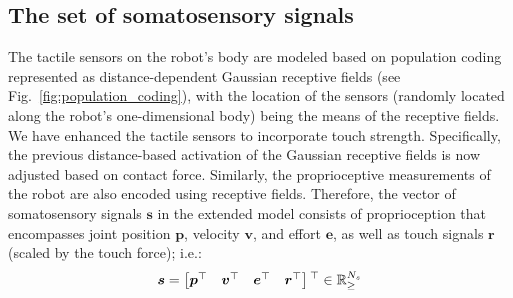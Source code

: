 \subsection{The set of somatosensory signals}
The tactile sensors on the robot's body are modeled based on population coding \cite{Panzeri2010PopulationCoding} represented as distance-dependent Gaussian receptive fields (see Fig.~\ref{fig:population_coding}), with the location of the sensors (randomly located along the robot's one-dimensional body) being the means of the receptive fields. We have enhanced the tactile sensors to incorporate touch strength. Specifically, the previous distance-based activation of the Gaussian receptive fields is now adjusted based on contact force. Similarly, the proprioceptive measurements of the robot are also encoded using receptive fields. Therefore, the vector of somatosensory signals $\bm{s}$ in the extended model consists of proprioception that encompasses joint position $\bm{p}$, velocity $\bm{v}$, and effort $\bm{e}$, as well as touch signals $\bm{r}$ (scaled by the touch force); i.e.:
\begin{equation}
	\bm{s} = \begin{bmatrix}
		\bm{p}{^{\top}} & \bm{v}{^{\top}} & \bm{e}{^{\top}} & \bm{r}{^{\top}}
	\end{bmatrix}{^{\top}} \in \mathbb{R}^{N_s}_{\geq}
\end{equation}



